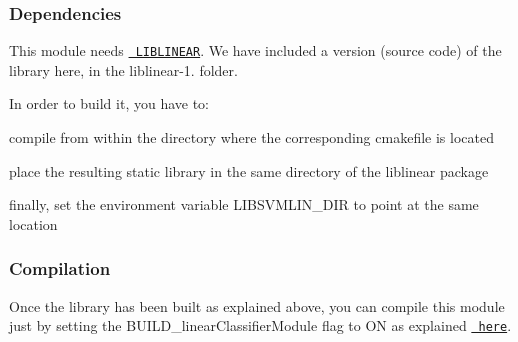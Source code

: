 \subsubsection*{Dependencies}

This module needs \href{https://www.csie.ntu.edu.tw/~cjlin/liblinear/}{\texttt{ L\+I\+B\+L\+I\+N\+E\+AR}}. We have included a version (source code) of the library here, in the {\ttfamily liblinear-\/1.} folder.

In order to build it, you have to\+:


\begin{DoxyItemize}
\item compile from within the directory where the corresponding {\ttfamily cmakefile} is located
\item place the resulting static library in the same directory of the {\ttfamily liblinear} package
\item finally, set the environment variable {\ttfamily L\+I\+B\+S\+V\+M\+L\+I\+N\+\_\+\+D\+IR} to point at the same location
\end{DoxyItemize}

\subsubsection*{Compilation}

Once the library has been built as explained above, you can compile this module just by setting the {\ttfamily B\+U\+I\+L\+D\+\_\+linear\+Classifier\+Module} flag to {\ttfamily ON} as explained \href{https://www.github.com/robotology/himrep/\#compilation}{\texttt{ here}}. 